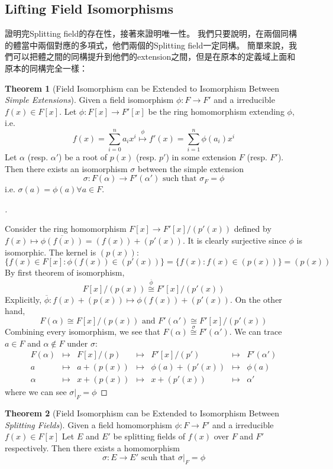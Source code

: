 \documentclass{article}
\theoremstyle{definition}
\newtheorem{thm}{Theorem}
\newenvironment{proofs}[1][\proofname]{%
  \begin{proof}[#1]$ $\par\nobreak\ignorespaces
}{%
  \end{proof}
}
\begin{document}
\subsection{Lifting Field Isomorphisms}

證明完Splitting field的存在性，接著來證明唯一性。
我們只要說明，在兩個同構的體當中兩個對應的多項式，他們兩個的Splitting field一定同構。
簡單來說，我們可以把體之間的同構提升到他們的extension之間，但是在原本的定義域上面和原本的同構完全一樣：

\begin{thm}[Field Isomorphism can be Extended to Isomorphism Between \textit{Simple Extensions}]
	Given a field isomorphism $\phi:F\to F'$ and a irreducible $f(x)\in F[x]$. Let ${\phi}:F[x]\to F'[x]$ be the ring homomorphism extending $\phi$, i.e.
	\[f(x)=\sum_{i=0}^n a_i x^i \overset{{\phi}}{\mapsto} f'(x)=\sum_{i=1}^n \phi(a_i) x^i\]
	Let $\alpha$ (resp. $\alpha'$) be a root of $p(x)$ (resp. $p'$) in some extension $F$ (resp. $F'$). Then there exists an isomorphism $\sigma$ between the simple extension
	\[\sigma:F(\alpha)\to F'(\alpha')\text{ such that } \sigma_F=\phi\]
	i.e. $\sigma(a)=\phi(a) \forall a \in F$.
\end{thm}

\begin{proofs}
	Consider the ring homomorphism $F[x]\to F'[x]/(p'(x))$ defined by $f(x)\mapsto \overline{\phi(f(x))}=(f(x))+(p'(x))$. It is clearly surjective since $\phi$ is isomorphic. The kernel is $(p(x))$:
	\[\{f(x)\in F[x]: \phi(f(x))\in (p'(x))\}=\{f(x): f(x)\in (p(x))\}=(p(x))\]
	By first theorem of isomorphism, 
	\[F[x]/(p(x))\overset{\overline{\phi}}{\cong} F'[x]/(p'(x))\]
	Explicitly, $\overline{\phi}: f(x)+(p(x))\mapsto \phi(f(x))+(p'(x))$. On the other hand,
	\[F(\alpha)\cong F[x]/(p(x)) \text{ and } F'(\alpha')\cong F'[x]/(p'(x))\]
	Combining every isomorphism, we see that $F(\alpha)\overset{\sigma}{\cong}F'(\alpha')$. 
	We can trace $a\in F$ and $\alpha \notin F$ under $\sigma$:
	\[\begin{matrix}
		F(\alpha) &\mapsto& F[x]/(p)&\mapsto& F'[x]/(p') &\mapsto& F'(\alpha') \\
		a &\mapsto& a+(p(x))&\mapsto& \phi(a) + (p'(x)) &\mapsto& \phi(a) \\
		\alpha &\mapsto& x+(p(x))&\mapsto& x + (p'(x)) &\mapsto& \alpha'
	\end{matrix} \]
	where we can see $\sigma|_F=\phi$
\end{proofs}

\begin{thm}[Field Isomorphism can be Extended to Isomorphism Between \textit{Splitting Fields}]
	Given a field homomorphism $\phi:F\to F'$ and a irreducible $f(x)\in F[x]$
	Let $E$ and $E'$ be splitting fields of $f(x)$ over $F$ and $F'$ respectively. Then there exists a homomorphism 
	\[\sigma:E\to E' \text{ scuh that }\sigma|_F=\phi\]
\end{thm}
\end{document}

